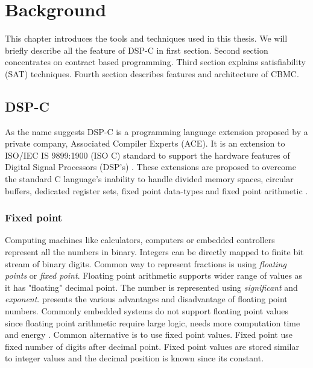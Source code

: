 


\chapter{Background} \label{chap:background}

This chapter introduces the tools and techniques used in this thesis. We will briefly describe all the feature of DSP-C in first section. Second section concentrates on contract based programming. Third section explains satisfiability (SAT) techniques. Fourth section describes features and architecture of CBMC.


\section{DSP-C}\label{sec:back:dspc}

As the name suggests DSP-C is a programming language extension proposed by a private company, Associated Compiler Experts (ACE). It is an extension to ISO/IEC IS 9899:1900 (ISO C) standard to support the hardware features of Digital Signal Processors (DSP's) \cite{website:dspc:specification}. These extensions are proposed to overcome the standard C language's inability to handle divided memory spaces, circular buffers, dedicated register sets, fixed point data-types and fixed point arithmetic \cite{dspcbenifits}.

\subsection{Fixed point}

Computing machines like calculators, computers or embedded controllers represent all the numbers in binary. Integers can be directly mapped to finite bit stream of binary digits. Common way to represent fractions is using \emph{floating points} or \emph{fixed point}. Floating point arithmetic supports wider range of values as it has "floating" decimal point. The number is represented using \emph{significant} and \emph{exponent}. \cite{overton2001numerical} presents the various advantages and disadvantage of floating point numbers. Commonly embedded systems do not support floating point values since floating point arithmetic require large logic, needs more computation time and energy \cite{tiwari1995power}. Common alternative is to use fixed point values. Fixed point use fixed number of digits after decimal point. Fixed point values are stored similar to integer values and the decimal position is known since its constant.

